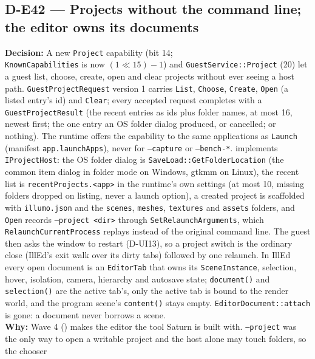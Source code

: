 \subsection*{D-E42 --- Projects without the command line; the editor owns its documents}
\begin{decisionbox}[title={D-E42 \quad 2026-10-22}]
\textbf{Decision:} A new \texttt{Project} capability (bit 14; \\
\texttt{KnownCapabilities} is now $(1 \ll 15) - 1$) and
\texttt{GuestService::Project} (20) let a guest list, choose, create, open
and clear projects without ever seeing a host path.
\texttt{GuestProjectRequest} version 1 carries \texttt{List}, \texttt{Choose},
\texttt{Create}, \texttt{Open} (a listed entry's id) and \texttt{Clear}; every
accepted request completes with a \texttt{GuestProjectResult} (the recent
entries as ids plus folder names, at most 16, newest first; the one entry an
OS folder dialog produced, or cancelled; or nothing). The runtime offers the
capability to the same applications as \texttt{Launch} (manifest
\texttt{app.launchApps}), never for \texttt{--capture} or \texttt{--bench-*}.
 implements \texttt{IProjectHost}: the OS
folder dialog is \texttt{SaveLoad::GetFolderLocation} (the common item dialog
in folder mode on Windows, gtkmm on Linux), the recent list is
\texttt{recentProjects.<app>} in the runtime's own settings (at most 10,
missing folders dropped on listing, never a launch option), a created project
is scaffolded with \texttt{illumo.json} and the \texttt{scenes}, \texttt{meshes},
\texttt{textures} and \texttt{assets} folders, and \texttt{Open} records
\texttt{--project <dir>} through \texttt{SetRelaunchArguments}, which
\texttt{RelaunchCurrentProcess} replays instead of the original command line.
The guest then asks the window to restart (D-UI13), so a project switch is the
ordinary close (IllEd's exit walk over its dirty tabs) followed by one
relaunch. In IllEd every open document is an \texttt{EditorTab} that owns its
\texttt{SceneInstance}, selection, hover, isolation, camera, hierarchy and
autosave state; \texttt{document()} and \texttt{selection()} are the active
tab's, only the active tab is bound to the render world, and the program
scene's \texttt{content()} stays empty. \texttt{EditorDocument::attach} is
gone: a document never borrows a scene.\\
\textbf{Why:} Wave 4 () makes the
editor the tool Saturn is built with. \texttt{--project} was the only way to
open a writable project and the host alone may touch folders, so the chooser

\end{decisionbox}
